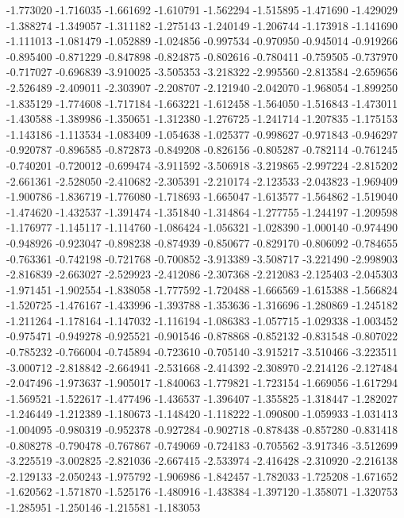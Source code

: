-1.773020
-1.716035
-1.661692
-1.610791
-1.562294
-1.515895
-1.471690
-1.429029
-1.388274
-1.349057
-1.311182
-1.275143
-1.240149
-1.206744
-1.173918
-1.141690
-1.111013
-1.081479
-1.052889
-1.024856
-0.997534
-0.970950
-0.945014
-0.919266
-0.895400
-0.871229
-0.847898
-0.824875
-0.802616
-0.780411
-0.759505
-0.737970
-0.717027
-0.696839
-3.910025
-3.505353
-3.218322
-2.995560
-2.813584
-2.659656
-2.526489
-2.409011
-2.303907
-2.208707
-2.121940
-2.042070
-1.968054
-1.899250
-1.835129
-1.774608
-1.717184
-1.663221
-1.612458
-1.564050
-1.516843
-1.473011
-1.430588
-1.389986
-1.350651
-1.312380
-1.276725
-1.241714
-1.207835
-1.175153
-1.143186
-1.113534
-1.083409
-1.054638
-1.025377
-0.998627
-0.971843
-0.946297
-0.920787
-0.896585
-0.872873
-0.849208
-0.826156
-0.805287
-0.782114
-0.761245
-0.740201
-0.720012
-0.699474
-3.911592
-3.506918
-3.219865
-2.997224
-2.815202
-2.661361
-2.528050
-2.410682
-2.305391
-2.210174
-2.123533
-2.043823
-1.969409
-1.900786
-1.836719
-1.776080
-1.718693
-1.665047
-1.613577
-1.564862
-1.519040
-1.474620
-1.432537
-1.391474
-1.351840
-1.314864
-1.277755
-1.244197
-1.209598
-1.176977
-1.145117
-1.114760
-1.086424
-1.056321
-1.028390
-1.000140
-0.974490
-0.948926
-0.923047
-0.898238
-0.874939
-0.850677
-0.829170
-0.806092
-0.784655
-0.763361
-0.742198
-0.721768
-0.700852
-3.913389
-3.508717
-3.221490
-2.998903
-2.816839
-2.663027
-2.529923
-2.412086
-2.307368
-2.212083
-2.125403
-2.045303
-1.971451
-1.902554
-1.838058
-1.777592
-1.720488
-1.666569
-1.615388
-1.566824
-1.520725
-1.476167
-1.433996
-1.393788
-1.353636
-1.316696
-1.280869
-1.245182
-1.211264
-1.178164
-1.147032
-1.116194
-1.086383
-1.057715
-1.029338
-1.003452
-0.975471
-0.949278
-0.925521
-0.901546
-0.878868
-0.852132
-0.831548
-0.807022
-0.785232
-0.766004
-0.745894
-0.723610
-0.705140
-3.915217
-3.510466
-3.223511
-3.000712
-2.818842
-2.664941
-2.531668
-2.414392
-2.308970
-2.214126
-2.127484
-2.047496
-1.973637
-1.905017
-1.840063
-1.779821
-1.723154
-1.669056
-1.617294
-1.569521
-1.522617
-1.477496
-1.436537
-1.396407
-1.355825
-1.318447
-1.282027
-1.246449
-1.212389
-1.180673
-1.148420
-1.118222
-1.090800
-1.059933
-1.031413
-1.004095
-0.980319
-0.952378
-0.927284
-0.902718
-0.878438
-0.857280
-0.831418
-0.808278
-0.790478
-0.767867
-0.749069
-0.724183
-0.705562
-3.917346
-3.512699
-3.225519
-3.002825
-2.821036
-2.667415
-2.533974
-2.416428
-2.310920
-2.216138
-2.129133
-2.050243
-1.975792
-1.906986
-1.842457
-1.782033
-1.725208
-1.671652
-1.620562
-1.571870
-1.525176
-1.480916
-1.438384
-1.397120
-1.358071
-1.320753
-1.285951
-1.250146
-1.215581
-1.183053
